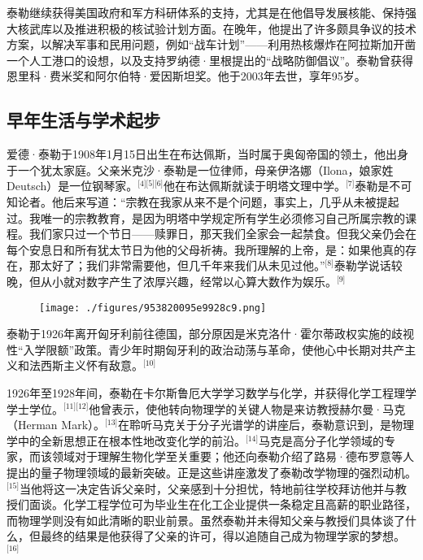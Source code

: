 泰勒继续获得美国政府和军方科研体系的支持，尤其是在他倡导发展核能、保持强大核武库以及推进积极的核试验计划方面。在晚年，他提出了许多颇具争议的技术方案，以解决军事和民用问题，例如“战车计划”——利用热核爆炸在阿拉斯加开凿一个人工港口的设想，以及支持罗纳德·里根提出的“战略防御倡议”。泰勒曾获得恩里科·费米奖和阿尔伯特·爱因斯坦奖。他于2003年去世，享年95岁。
\subsection{早年生活与学术起步}
爱德·泰勒于1908年1月15日出生在布达佩斯，当时属于奥匈帝国的领土，他出身于一个犹太家庭。父亲米克沙·泰勒是一位律师，母亲伊洛娜（Ilona，娘家姓Deutsch）是一位钢琴家。\(^\text{[4][5][6]}\)他在布达佩斯就读于明塔文理中学。\(^\text{[7]}\)泰勒是不可知论者。他后来写道：“宗教在我家从来不是个问题，事实上，几乎从未被提起过。我唯一的宗教教育，是因为明塔中学规定所有学生必须修习自己所属宗教的课程。我们家只过一个节日——赎罪日，那天我们全家会一起禁食。但我父亲仍会在每个安息日和所有犹太节日为他的父母祈祷。我所理解的上帝，是：如果他真的存在，那太好了；我们非常需要他，但几千年来我们从未见过他。”\(^\text{[8]}\)泰勒学说话较晚，但从小就对数字产生了浓厚兴趣，经常以心算大数作为娱乐。\(^\text{[9]}\)
\begin{figure}[ht]
\centering
\texttt{[image: ./figures/953820095e9928c9.png]}
\caption{} \label{fig_ADHTL_2}
\end{figure}
泰勒于1926年离开匈牙利前往德国，部分原因是米克洛什·霍尔蒂政权实施的歧视性“入学限额”政策。青少年时期匈牙利的政治动荡与革命，使他心中长期对共产主义和法西斯主义怀有敌意。\(^\text{[10]}\)

1926年至1928年间，泰勒在卡尔斯鲁厄大学学习数学与化学，并获得化学工程理学学士学位。\(^\text{[11][12]}\)他曾表示，使他转向物理学的关键人物是来访教授赫尔曼·马克（Herman Mark）。\(^\text{[13]}\)在聆听马克关于分子光谱学的讲座后，泰勒意识到，是物理学中的全新思想正在根本性地改变化学的前沿。\(^\text{[14]}\)马克是高分子化学领域的专家，而该领域对于理解生物化学至关重要；他还向泰勒介绍了路易·德布罗意等人提出的量子物理领域的最新突破。正是这些讲座激发了泰勒改学物理的强烈动机。\(^\text{[15]}\)当他将这一决定告诉父亲时，父亲感到十分担忧，特地前往学校拜访他并与教授们面谈。化学工程学位可为毕业生在化工企业提供一条稳定且高薪的职业路径，而物理学则没有如此清晰的职业前景。虽然泰勒并未得知父亲与教授们具体谈了什么，但最终的结果是他获得了父亲的许可，得以追随自己成为物理学家的梦想。\(^\text{[16]}\)

